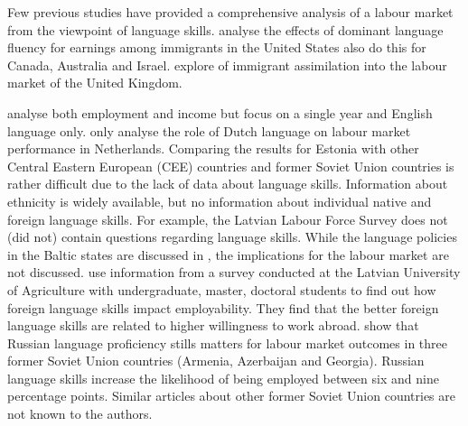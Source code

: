\documentclass[12pt, a4paper]{article}
\begin{document}
Few previous studies have provided a comprehensive analysis of a labour
market from the viewpoint of language skills.
\citet{Chiswick1995, chiswick+miller2002, chiswick+miller2007, Bellante1998, Chiswick2010} analyse the effects of dominant language fluency for earnings among immigrants in the United States
\citet{Chiswick1995}  also do this for Canada, Australia and Israel.
\citet{Dustmann2003, shields+price2002} explore of immigrant assimilation into the labour market of the United Kingdom.


\citet{leslie+lindley2001} analyse both employment and income but
focus on a single year and English language only.
\citet{YaoandOurs2015} only analyse the role of Dutch language
on labour market performance in Netherlands.  
Comparing the results for Estonia with other Central Eastern European (CEE) countries and former Soviet Union countries is rather difficult due to the lack of data about language skills.
Information about ethnicity is widely available, but no information about individual native and foreign language skills.
For example, the Latvian Labour Force Survey does not (did not) contain questions regarding language skills.
While the language policies in the Baltic states are discussed in \cite{Hogan-Brun2008,Hogan-Brun2007}, the implications for the labour market are not discussed.
\cite{Grasmane2011} use information from a survey conducted at the Latvian University of Agriculture with undergraduate, master, doctoral students to find out  how foreign language skills impact employability.
They find that the better foreign language skills are related to higher willingness to work abroad.
\cite{Alan2015}  show that Russian language proficiency stills matters for labour market outcomes in three former Soviet Union countries (Armenia, Azerbaijan and Georgia). Russian language skills increase the likelihood of being employed between six and nine percentage points. 
Similar articles about other former Soviet Union countries are not known to the authors.
\end{document}
